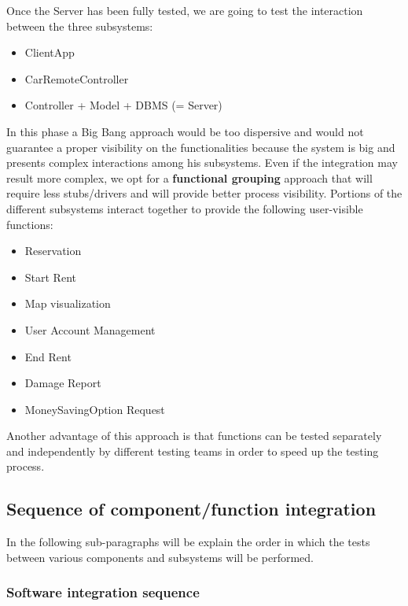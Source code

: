 Once the Server has been fully tested, we are going to test the interaction between the three subsystems:
\begin{itemize}
\item ClientApp
\item CarRemoteController
\item Controller + Model + DBMS  (= Server)
\end{itemize}
In this phase a Big Bang approach would be too dispersive and would not guarantee a proper visibility on the functionalities because the system is big and presents complex interactions among his subsystems.
Even if the integration may result more complex, we opt for a \textbf{functional grouping} approach that will require less stubs/drivers and will provide better process visibility.
Portions of the different subsystems interact together to provide the following user-visible functions:
\begin{itemize}
\item Reservation
\item Start Rent
\item Map visualization
\item User Account Management
\item End Rent
\item Damage Report
\item MoneySavingOption Request
\end{itemize}
Another advantage of this approach is that functions can be tested separately and independently by different testing teams in order to speed up the testing process. 


\newpage

\subsection{Sequence of component/function integration}
In the following sub-paragraphs will be explain the order in which the tests between various components and subsystems will be performed. 

\subsubsection{Software integration sequence}

